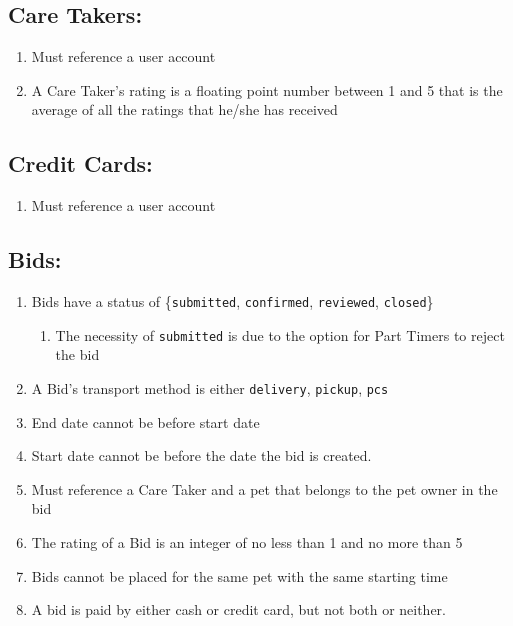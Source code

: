\documentclass[
  paper=a4,
  ,captions=tableheading
]{scrartcl}
\newcommand{\passthrough}[1]{#1}
\providecommand{\tightlist}{%
  \setlength{\itemsep}{0pt}\setlength{\parskip}{0pt}}
\begin{document}
\hypertarget{care-takers}{%
\subsection{Care Takers:}\label{care-takers}}

\begin{enumerate}
\def\labelenumi{\arabic{enumi}.}
\tightlist
\item
  Must reference a user account
\item
  A Care Taker's rating is a floating point number between 1 and 5 that
  is the average of all the ratings that he/she has received
\end{enumerate}

\hypertarget{credit-cards}{%
\subsection{Credit Cards:}\label{credit-cards}}

\begin{enumerate}
\def\labelenumi{\arabic{enumi}.}
\tightlist
\item
  Must reference a user account
\end{enumerate}

\hypertarget{bids}{%
\subsection{Bids:}\label{bids}}

\begin{enumerate}
\def\labelenumi{\arabic{enumi}.}
\tightlist
\item
  Bids have a status of \{\passthrough{\lstinline!submitted!},
  \passthrough{\lstinline!confirmed!},
  \passthrough{\lstinline!reviewed!}, \passthrough{\lstinline!closed!}\}

  \begin{enumerate}
  \def\labelenumii{\arabic{enumii}.}
  \tightlist
  \item
    The necessity of \passthrough{\lstinline!submitted!} is due to the
    option for Part Timers to reject the bid
  \end{enumerate}
\item
  A Bid's transport method is either \passthrough{\lstinline!delivery!},
  \passthrough{\lstinline!pickup!}, \passthrough{\lstinline!pcs!}
\item
  End date cannot be before start date
\item
  Start date cannot be before the date the bid is created.
\item
  Must reference a Care Taker and a pet that belongs to the pet owner in
  the bid
\item
  The rating of a Bid is an integer of no less than 1 and no more than 5
\item
  Bids cannot be placed for the same pet with the same starting time
\item
  A bid is paid by either cash or credit card, but not both or neither.
\end{enumerate}
\end{document}
